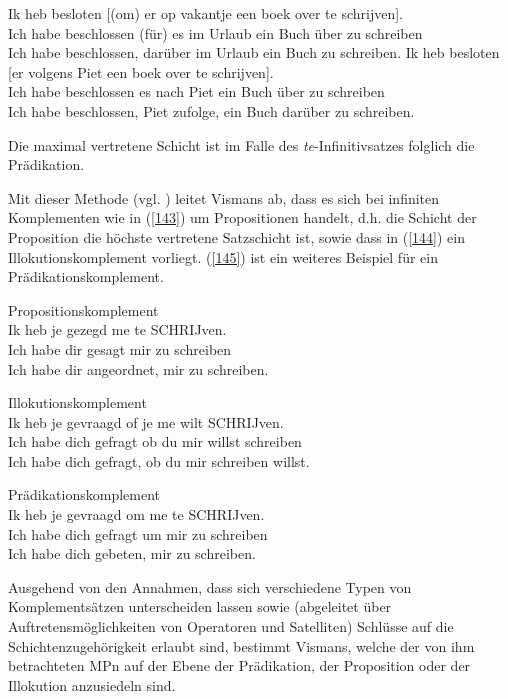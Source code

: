 \begin{exe}
	\ex\label{142} 
	\begin{xlist}	
			\ex\label{142a} 
			\gll Ik heb besloten [(om) er op vakantje een boek over te schrijven].\\
			 Ich habe beschlossen (für) es im Urlaub ein Buch über zu schreiben\\
			\glt Ich habe beschlossen, darüber im Urlaub ein Buch zu schreiben.
			\ex\label{142b}
			\gll *Ik heb besloten [er volgens Piet een boek over te schrijven].\\
			 Ich habe beschlossen es nach Piet ein Buch über zu schreiben\\
			\glt Ich habe beschlossen, Piet zufolge, ein Buch darüber zu schreiben.		
	\end{xlist}
	\hfill\hbox{\citet[152]{Vismans1994}}
\end{exe}
Die maximal vertretene Schicht ist im Falle des \textit{te}-Infinitivsatzes folglich  die Prädikation. 

Mit dieser Methode (vgl. \citealt[148-155]{Vismans1994}) leitet Vismans ab, dass es sich bei infiniten Komplementen wie in (\ref{143}) um Propositionen handelt, d.h. die Schicht der Proposition die höchste vertretene Satzschicht ist, sowie dass in (\ref{144}) ein Illokutionskomplement vorliegt. (\ref{145}) ist ein weiteres Beispiel für ein Prädikationskomplement.

\begin{exe}
	\ex\label{143}
	Propositionskomplement\\
	\gll Ik heb je gezegd me te SCHRIJven.\\
	Ich habe dir gesagt  mir zu schreiben\\
	\glt Ich habe dir angeordnet, mir zu schreiben.	
\end{exe}

\begin{exe}
	\ex\label{144}
	Illokutionskomplement\\
	\gll Ik heb je gevraagd of je me wilt SCHRIJven.\\
	Ich habe dich gefragt ob du mir willst schreiben\\
	\glt Ich habe dich gefragt, ob du mir schreiben willst.	
\end{exe}

\begin{exe}
	\ex\label{145}
	Prädikationskomplement\\
	\gll Ik heb je gevraagd om me te SCHRIJven.\\
	Ich habe dich gefragt um mir zu schreiben\\
	\glt Ich habe dich gebeten, mir zu schreiben.	
	\hbox{}\hfill\hbox {\citet[156]{Vismans1994}}
\end{exe}		
Ausgehend von den Annahmen, dass sich verschiedene Typen von Komplement\-sätzen unterscheiden lassen sowie (abgeleitet über Auftretensmöglichkeiten von Operatoren und Satelliten) Schlüsse auf die Schichtenzugehörigkeit erlaubt sind, bestimmt Vismans, welche der von ihm betrachteten MPn auf der Ebene der Prädikation, der Proposition oder der Illokution anzusiedeln sind.

